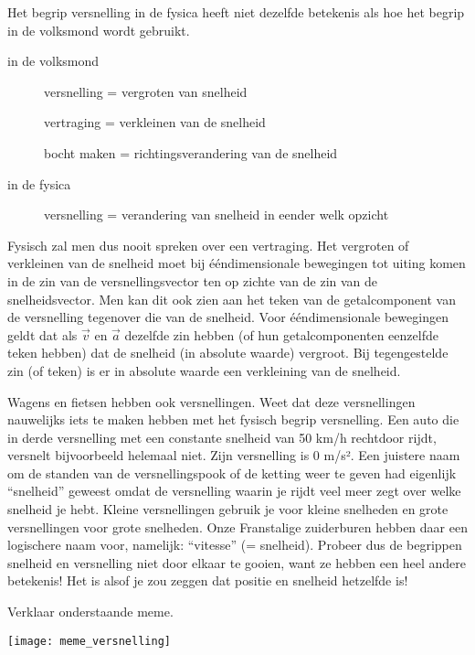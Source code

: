 \documentclass{ximera}
\begin{document}
\begin{remark}
	Het begrip versnelling in de fysica heeft niet dezelfde betekenis als hoe het begrip in de volksmond wordt gebruikt.
	\begin{description}
		\item[in de volksmond] 
			\begin{itemize}
				versnelling = vergroten van snelheid

				vertraging = verkleinen van de snelheid

				bocht maken = richtingsverandering van de snelheid
			\end{itemize}
		\item[in de fysica]
			versnelling = verandering van snelheid in eender welk opzicht
	\end{description}

	Fysisch zal men dus nooit spreken over een vertraging. Het vergroten of verkleinen van de snelheid moet bij ééndimensionale bewegingen tot uiting komen in de zin van de versnellingsvector ten op zichte van de zin van de snelheidsvector. Men kan dit ook zien aan het teken van de getalcomponent van de versnelling tegenover die van de snelheid.
	Voor ééndimensionale bewegingen geldt dat als \(\vec{v}\) en \(\vec{a}\) dezelfde zin hebben (of hun getalcomponenten eenzelfde teken hebben) dat de snelheid (in absolute waarde) vergroot. Bij tegengestelde zin (of teken) is er in absolute waarde een verkleining van de snelheid.

\end{remark}

\begin{remark}

	Wagens en fietsen hebben ook versnellingen. Weet dat deze versnellingen nauwelijks iets te maken hebben met het fysisch begrip versnelling. Een auto die in derde versnelling met een constante snelheid van 50 km/h rechtdoor rijdt, versnelt bijvoorbeeld helemaal niet. Zijn versnelling is 0 m/s². Een juistere naam om de standen van de versnellingspook of de ketting weer te geven had eigenlijk “snelheid” geweest omdat de versnelling waarin je rijdt veel meer zegt over welke snelheid je hebt. Kleine versnellingen gebruik je voor kleine snelheden en grote versnellingen voor grote snelheden. Onze Franstalige zuiderburen hebben daar een logischere naam voor, namelijk: “vitesse” (= snelheid). Probeer dus de begrippen snelheid en versnelling niet door elkaar te gooien, want ze hebben een heel andere betekenis! Het is alsof je zou zeggen dat positie en snelheid hetzelfde is!


\end{remark}

\begin{exercise}
Verklaar onderstaande meme. 

\begin{image}
\texttt{[image: meme\_versnelling]}
\end{image}

\end{exercise}
	
\end{document}
